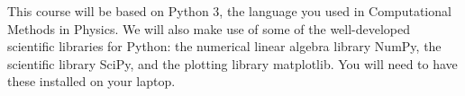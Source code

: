 \documentclass[12pt]{mcplain}
\begin{document}
%
%
%
%
%
%
%
%
%

%


This course will be based on Python 3, the language you used in Computational
Methods in Physics. We will also make use of some of the well-developed
scientific libraries for Python: the numerical linear algebra library NumPy, the
scientific library SciPy, and the plotting library matplotlib. You will need
to have these installed on your laptop.
\end{document}

